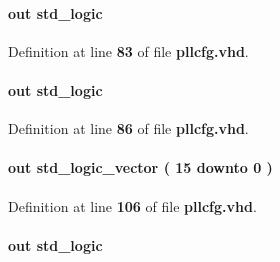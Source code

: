 \paragraph[{c2\+\_\+odddiv}]{ {\bfseries \textcolor{keywordflow}{out}\textcolor{vhdlchar}{ }} {\bfseries \textcolor{comment}{std\+\_\+logic}\textcolor{vhdlchar}{ }} \hspace{0.3cm}{\ttfamily [Port]}}\label{classpllcfg_ac2264803a9e388b79f529d23d2375e66}


Definition at line {\bf 83} of file {\bf pllcfg.\+vhd}.

\paragraph[{c3\+\_\+byp}]{ {\bfseries \textcolor{keywordflow}{out}\textcolor{vhdlchar}{ }} {\bfseries \textcolor{comment}{std\+\_\+logic}\textcolor{vhdlchar}{ }} \hspace{0.3cm}{\ttfamily [Port]}}\label{classpllcfg_ae1288a508864c3135a10485ffa9f5264}


Definition at line {\bf 86} of file {\bf pllcfg.\+vhd}.

\paragraph[{c3\+\_\+cnt}]{ {\bfseries \textcolor{keywordflow}{out}\textcolor{vhdlchar}{ }} {\bfseries \textcolor{comment}{std\+\_\+logic\+\_\+vector}\textcolor{vhdlchar}{ }\textcolor{vhdlchar}{(}\textcolor{vhdlchar}{ }\textcolor{vhdlchar}{ } \textcolor{vhdldigit}{15} \textcolor{vhdlchar}{ }\textcolor{keywordflow}{downto}\textcolor{vhdlchar}{ }\textcolor{vhdlchar}{ } \textcolor{vhdldigit}{0} \textcolor{vhdlchar}{ }\textcolor{vhdlchar}{)}\textcolor{vhdlchar}{ }} \hspace{0.3cm}{\ttfamily [Port]}}\label{classpllcfg_ab6da5f6dab913f3bd4687533fe59d78d}


Definition at line {\bf 106} of file {\bf pllcfg.\+vhd}.

\paragraph[{c3\+\_\+odddiv}]{ {\bfseries \textcolor{keywordflow}{out}\textcolor{vhdlchar}{ }} {\bfseries \textcolor{comment}{std\+\_\+logic}\textcolor{vhdlchar}{ }} \hspace{0.3cm}{\ttfamily [Port]}}\label{classpllcfg_aaba7d44e8287b1d3917d08d7e9f66cca}



